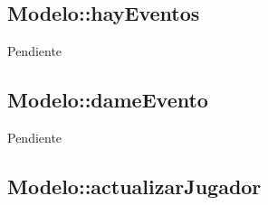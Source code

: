 \documentclass[a4paper,10pt,twoside]{article}
\begin{document}








\subsection{Modelo::hayEventos}

Pendiente


\subsection{Modelo::dameEvento}

Pendiente


\subsection{Modelo::actualizarJugador}
\end{document}
